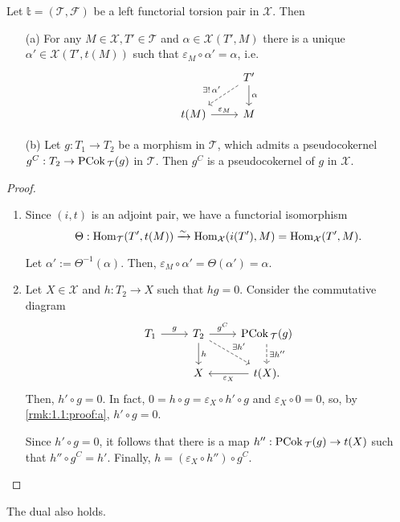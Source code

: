 \begin{rmk}\label{rmk:1.1}
  Let $\mathbb{t}=(\mathcal{T},\mathcal{F})$ be a left functorial torsion pair in $\mathcal{X}$.
  Then
  \begin{enumerate}
    \item[(a)] For any $M\in\mathcal{X}, T'\in\mathcal{T}$ and $\alpha\in\mathcal{X}(T',M)$ there
    is a unique $\alpha'\in\mathcal{X}(T',t(M))$ such that $\varepsilon_M\circ\alpha'=\alpha$, i.e.
    \begin{equation*}
      \begin{tikzcd}
        & T'\arrow[dashed]{ld}[']{\exists!\,\alpha'}\arrow{d}{\alpha}\\
        t(M)\arrow{r}{\varepsilon_M}&M
      \end{tikzcd}
    \end{equation*}
    \item[(b)] Let $g:T_1\to T_2$ be a morphism in $\mathcal{T}$, which admits a pseudocokernel
    $g^C:T_2\to\mathrm{\textup{PCok\,}}_\mathcal{T}(g)$ in $\mathcal{T}$. Then $g^C$ is a pseudocokernel of $g$
    in $\mathcal{X}$.
  \end{enumerate}
\end{rmk}

\begin{proof}
  \begin{enumerate}[label=(\alph*)]
    \item\label{rmk:1.1:proof:a}  Since $(i,t)$ is an adjoint pair, we have a functorial isomorphism
      \begin{equation*}
        \Theta:\mathrm{Hom}_{\mathcal{T}}(T',t(M))\xrightarrow{\sim}\mathrm{Hom}_{\mathcal{X}}(i(T'),M)=\mathrm{Hom}_{\mathcal{X}}(T',M).
      \end{equation*}

      Let $\alpha':=\Theta^{-1}(\alpha)$. Then, $\varepsilon_M\circ \alpha'=\Theta(\alpha')=\alpha$.
    \item Let $X\in\mathcal{X}$ and $h:T_2\to X$ such that $hg=0$. Consider the commutative diagram
    \begin{equation*}
      \begin{tikzcd}
        T_1\arrow{r}{g}
          & T_2\arrow{r}{g^C}\arrow{d}{h}\arrow[dashed]{dr}{\exists h'}
            & \PCok_\mathcal{T}(g)\arrow[dashed]{d}{\exists h''}\\
          & X
            & t(X)\arrow{l}{\varepsilon_X}.
      \end{tikzcd}
    \end{equation*}
    Then, $h'\circ g=0$. In fact, $0=h\circ g=\varepsilon_X \circ h' \circ g$
    and $\varepsilon_X\circ 0=0$, so, by \ref{rmk:1.1:proof:a}, $h'\circ g=0$.

    Since $h'\circ g=0$, it follows that there is a map $h'':\mathrm{\textup{PCok\,}}_\mathcal{T}(g)\to t(X)$
    such that $h''\circ g^C=h'$. Finally, $h=(\varepsilon_X\circ h'')\circ g^C$.
  \end{enumerate}
\end{proof}

The dual also holds.

